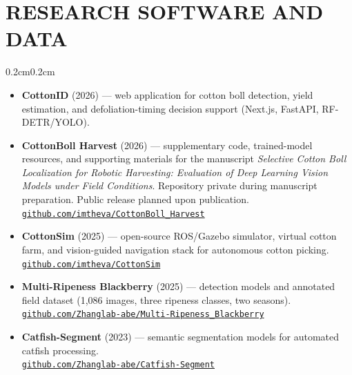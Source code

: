 \documentclass[10pt, letterpaper]{article}
\newcommand{\repo}[1]{\href{https://#1}{\texttt{#1}}}
\newenvironment{highlights}{%
    \begin{itemize}[topsep=0.08cm, parsep=0.08cm, partopsep=0pt,
                    itemsep=0pt, leftmargin=0.4cm + 10pt]
}{\end{itemize}}
\newenvironment{onecolentry}{%
    \begin{adjustwidth}{0.2cm}{0.2cm}
}{\end{adjustwidth}}
\begin{document}
\section{RESEARCH SOFTWARE AND DATA}
\vspace{0.08cm}
\begin{onecolentry}
    \begin{highlights}
        \item \textbf{CottonID} (2026) --- web application for cotton boll detection,
              yield estimation, and defoliation-timing decision support
              (Next.js, FastAPI, RF-DETR/YOLO).
        \item \textbf{CottonBoll Harvest} (2026) --- supplementary code, trained-model
              resources, and supporting materials for the manuscript
              \emph{Selective Cotton Boll Localization for Robotic Harvesting:
              Evaluation of Deep Learning Vision Models under Field Conditions}.
              Repository private during manuscript preparation. Public release planned upon publication.
              \\ \repo{github.com/imtheva/CottonBoll\_Harvest}
        \item \textbf{CottonSim} (2025) --- open-source ROS/Gazebo simulator, virtual
              cotton farm, and vision-guided navigation stack for autonomous cotton
              picking. \\ \repo{github.com/imtheva/CottonSim}
        \item \textbf{Multi-Ripeness Blackberry} (2025) --- detection models and
              annotated field dataset (1{,}086 images, three ripeness classes, two
              seasons). \\ \repo{github.com/Zhanglab-abe/Multi-Ripeness\_Blackberry}
        \item \textbf{Catfish-Segment} (2023) --- semantic segmentation models for
              automated catfish processing.
              \\ \repo{github.com/Zhanglab-abe/Catfish-Segment}
    \end{highlights}
\end{onecolentry}
\vspace{0.10cm}

\end{document}
